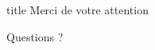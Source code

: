 \documentclass[10pt]{beamer}
\begin{document}
\begin{frame}
  \vfill
  \centering
  \begin{beamercolorbox}[sep=14pt, center, shadow=true, rounded=true]{title}
    \Large Merci de votre attention\par
    \vspace{6pt}
    \normalsize Questions ?
  \end{beamercolorbox}
  \vfill
\end{frame}
\end{document}
